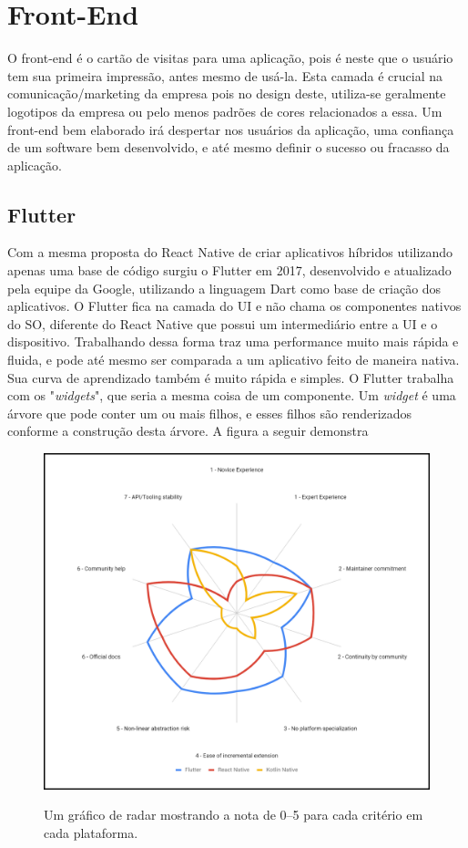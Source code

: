 \section{Front-End}
O front-end é o cartão de visitas para uma aplicação, pois é neste que o usuário tem sua primeira impressão, antes mesmo de usá-la. Esta camada é crucial na comunicação/marketing da empresa pois no design deste, utiliza-se geralmente logotipos da empresa ou pelo menos padrões de cores relacionados a essa. Um front-end bem elaborado irá despertar nos usuários da aplicação, uma confiança de um software bem desenvolvido, e até mesmo definir o sucesso ou fracasso da aplicação.
\cite{universoprograma}

\subsection{Flutter}
Com a mesma proposta do React Native de criar aplicativos híbridos utilizando apenas uma base de código surgiu o Flutter em 2017, desenvolvido e atualizado pela equipe da Google, utilizando a linguagem Dart como base de criação dos aplicativos.
O Flutter fica na camada do UI e não chama os componentes nativos do SO, diferente do React Native que possui um intermediário entre a UI e o dispositivo. Trabalhando dessa forma traz uma performance muito mais rápida e fluida, e pode até mesmo ser comparada a um aplicativo feito de maneira nativa. Sua curva de aprendizado também é muito rápida e simples.
O Flutter trabalha com os "\textit{widgets}", que seria a mesma coisa de um componente. Um \textit{widget} é uma árvore que pode conter um ou mais filhos, e esses filhos são renderizados conforme a construção desta árvore. 
\cite{flutter}
A figura a seguir demonstra

\begin{figure}[H]
    \centering
        \caption{Um gráfico de radar mostrando a nota de 0–5 para cada critério em cada plataforma.}
        \includegraphics[scale=0.3]{Imagens/flutter.png}
        \label{fig:flutter}
\end{figure}


